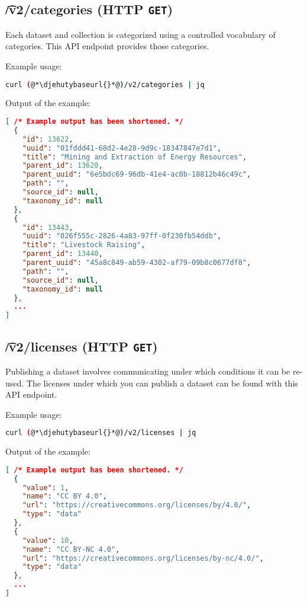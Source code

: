 \subsection{\t{/v2/categories} (HTTP \texttt{GET})}
\label{sec:v2-categories}

  Each dataset and collection is categorized using a controlled vocabulary
  of categories.  This API endpoint provides those categories.

  Example usage:
\begin{lstlisting}[language=bash]
curl (@*\djehutybaseurl{}*@)/v2/categories | jq
\end{lstlisting}

  Output of the example:
\begin{lstlisting}[language=JSON]
[ /* Example output has been shortened. */
  {
    "id": 13622,
    "uuid": "01fddd41-68d2-4e28-9d9c-18347847e7d1",
    "title": "Mining and Extraction of Energy Resources",
    "parent_id": 13620,
    "parent_uuid": "6e5bdc69-96db-41e4-ac0b-18812b46c49c",
    "path": "",
    "source_id": null,
    "taxonomy_id": null
  },
  {
    "id": 13443,
    "uuid": "026f555c-2826-4a83-97ff-0f230fb54ddb",
    "title": "Livestock Raising",
    "parent_id": 13440,
    "parent_uuid": "45a8c849-ab59-4302-af79-09b8c0677df8",
    "path": "",
    "source_id": null,
    "taxonomy_id": null
  },
  ...
]
\end{lstlisting}

\subsection{\t{/v2/licenses} (HTTP \texttt{GET})}
\label{sec:v2-licenses}

  Publishing a dataset involves communicating under which conditions it can be
  re-used.  The licenses under which you can publish a dataset can be found with
  this API endpoint.

  Example usage:
\begin{lstlisting}[language=bash]
curl (@*\djehutybaseurl{}*@)/v2/licenses | jq
\end{lstlisting}

  Output of the example:
\begin{lstlisting}[language=JSON]
[ /* Example output has been shortened. */
  {
    "value": 1,
    "name": "CC BY 4.0",
    "url": "https://creativecommons.org/licenses/by/4.0/",
    "type": "data"
  },
  {
    "value": 10,
    "name": "CC BY-NC 4.0",
    "url": "https://creativecommons.org/licenses/by-nc/4.0/",
    "type": "data"
  },
  ...
]
\end{lstlisting}

